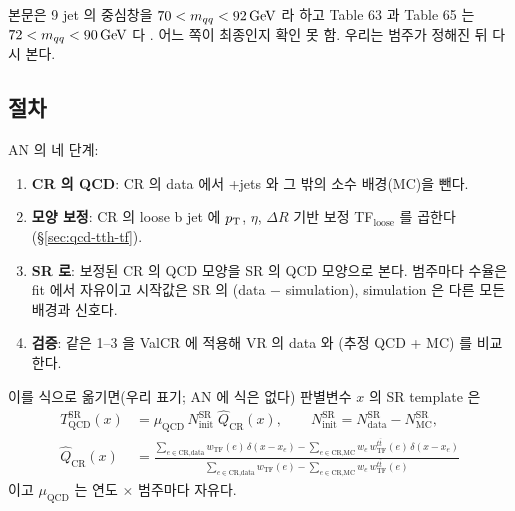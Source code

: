 \begin{openq}
본문은 9 jet 의 중심창을 $70<m_{qq}<92\,\mathrm{GeV}$ 라 하고 Table 63 과 Table 65 는 $72<m_{qq}<90\,\mathrm{GeV}$ 다
. 어느 쪽이 최종인지 확인 못 함. 우리는 범주가 정해진 뒤 다시 본다.
\end{openq}

\subsection{절차}\label{sec:qcd-tth-proc}
AN 의 네 단계:
\begin{enumerate}
\item \textbf{CR 의 QCD}: CR 의 data 에서 \ttbar{}+jets 와 그 밖의 소수 배경(MC)을 뺀다.
\item \textbf{모양 보정}: CR 의 loose b jet 에 $p_{\mathrm{T}}$, $\eta$, $\Delta R$ 기반 보정 TF$_{\text{loose}}$ 를 곱한다(\S\ref{sec:qcd-tth-tf}).
\item \textbf{SR 로}: 보정된 CR 의 QCD 모양을 SR 의 QCD 모양으로 본다. 범주마다 수율은 fit 에서 자유이고 시작값은 SR 의 (data $-$ simulation),
      simulation 은 다른 모든 배경과 신호다.
\item \textbf{검증}: 같은 1–3 을 ValCR 에 적용해 VR 의 data 와 (추정 QCD + MC) 를 비교한다.
\end{enumerate}
이를 식으로 옮기면(우리 표기; AN 에 식은 없다) 판별변수 $x$ 의 SR template 은
\begin{align}
T^{\text{SR}}_{\text{QCD}}(x)&=\mu_{\text{QCD}}\,N^{\text{SR}}_{\text{init}}\;\hat Q_{\text{CR}}(x),\qquad
N^{\text{SR}}_{\text{init}}=N^{\text{SR}}_{\text{data}}-N^{\text{SR}}_{\text{MC}},\label{eq:qcd-template}\\
\hat Q_{\text{CR}}(x)&=\frac{\sum_{e\in\text{CR,data}}w_{\text{TF}}(e)\,\delta(x-x_e)-\sum_{e\in\text{CR,MC}}w_e\,w^{t\bar t}_{\text{TF}}(e)\,\delta(x-x_e)}
{\sum_{e\in\text{CR,data}}w_{\text{TF}}(e)-\sum_{e\in\text{CR,MC}}w_e\,w^{t\bar t}_{\text{TF}}(e)}\nonumber
\end{align}
이고 $\mu_{\text{QCD}}$ 는 연도 $\times$ 범주마다 자유다.

